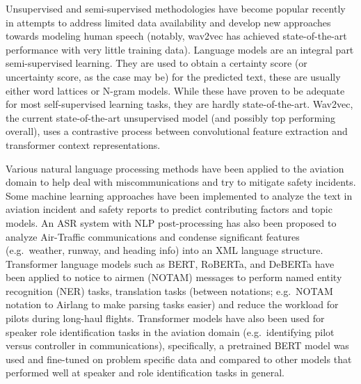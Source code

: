 \documentclass[12pt]{article}
\begin{document}
Unsupervised and semi-supervised methodologies have become popular recently in attempts to address limited data availability
and develop new approaches towards modeling human speech (notably, wav2vec has achieved state-of-the-art performance with
very little training data)\cite{baevski_wav2vec_2020,badrinath_automatic_2022,srinivasamurthy_semi-supervised_2017,zuluaga-gomez_contextual_2021}.
Language models are an integral part semi-supervised learning. They are used to obtain a certainty score (or uncertainty
score, as the case may be) for the predicted text, these are usually either word lattices or N-gram models\cite{badrinath_automatic_2022,srinivasamurthy_semi-supervised_2017,zuluaga-gomez_contextual_2021}.
While these have proven to be adequate for most self-supervised learning tasks, they are hardly state-of-the-art.
Wav2vec, the current state-of-the-art unsupervised model (and possibly top performing overall), uses a contrastive process
between convolutional feature extraction and transformer context representations\cite{baevski_wav2vec_2020}.


Various natural language processing methods have been applied to the aviation domain to help deal with miscommunications
and try to mitigate safety incidents\cite{ragnarsdottir_language_2003,tanguy_natural_2016,madeira_machine_2021}.
Some machine learning approaches have been implemented to analyze the text in aviation incident and safety reports to predict
contributing factors and topic models\cite{tanguy_natural_2016,madeira_machine_2021}. An ASR system with NLP post-processing
has also been proposed to analyze Air-Traffic communications and condense significant features (e.g.~weather, runway, and
heading info) into an XML language structure\cite{ragnarsdottir_language_2003}. Transformer language models such as BERT,
RoBERTa, and DeBERTa have been applied to notice to airmen (NOTAM) messages to perform named entity recognition (NER) tasks,
translation tasks (between notations; e.g.~NOTAM notation to Airlang to make parsing tasks easier) and reduce the workload
for pilots during long-haul flights\cite{arnold_knowledge_2022}. Transformer models have also been used for speaker role
identification tasks in the aviation domain (e.g.~identifying pilot versus controller in communications), specifically,
a pretrained BERT model was used and fine-tuned on problem specific data and compared to other models that performed
well at speaker and role identification tasks in general\cite{guo_comparative_2022}.
\end{document}
